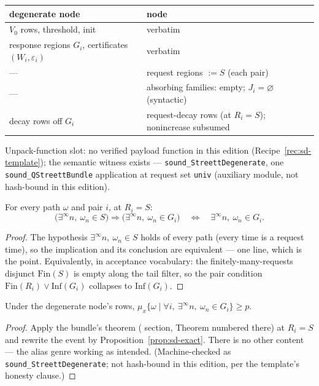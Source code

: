 \begin{brecipe}\label{rec:sd-transport}
\begin{center}\small
\begin{tabular}{@{}ll@{}}
\textbf{degenerate node} & \textbf{{QStreettBundle} node}\\
\midrule
$V_0$ rows, threshold, init & verbatim\\
response regions $G_i$, certificates $(W_i, \varepsilon_i)$ & verbatim\\
--- & request regions $:= S$ (each pair)\\
--- & absorbing families: empty; $J_i = \varnothing$ (syntactic)\\
decay rows off $G_i$ & request-decay rows (at $R_i = S$); nonincrease subsumed\\
\end{tabular}
\end{center}
Unpack-function slot: no verified payload function in this edition
(Recipe~\ref{rec:sd-template}); the semantic witness exists ---
\texttt{sound\_StreettDegenerate}, one \texttt{sound\_QStreettBundle}
application at request set \texttt{univ} (auxiliary module, not
hash-bound in this edition).
\end{brecipe}

\begin{bprop}\label{prop:sd-exact}
For every path $\omega$ and pair $i$, at $R_i = S$:
\[
\bigl(\exists^\infty n,\ \omega_n \in S\bigr) \Rightarrow
\bigl(\exists^\infty n,\ \omega_n \in G_i\bigr)
\quad\Longleftrightarrow\quad
\exists^\infty n,\ \omega_n \in G_i .
\]
\end{bprop}
\begin{proof}
The hypothesis $\exists^\infty n,\ \omega_n \in S$ holds of every path
(every time is a request time), so the implication and its conclusion are
equivalent --- one line, which is the point. Equivalently, in acceptance
vocabulary: the finitely-many-requests disjunct
$\mathrm{Fin}(S)$ is empty along the tail filter, so the pair condition
$\mathrm{Fin}(R_i) \vee \mathrm{Inf}(G_i)$ collapses to
$\mathrm{Inf}(G_i)$.
\end{proof}

\begin{bprop}\label{prop:sd-sound}
Under the degenerate node's rows,
$\mu_x\{\omega \mid \forall i,\ \exists^\infty n,\ \omega_n \in G_i\}
\ge p$.
\end{bprop}
\begin{proof}
Apply the bundle's theorem ( section,
Theorem numbered there) at $R_i = S$ and rewrite the event by
Proposition~\ref{prop:sd-exact}. There is no other content --- the alias
genre working as intended. (Machine-checked as
\texttt{sound\_StreettDegenerate}; not hash-bound in this edition, per the template's
honesty clause.)
\end{proof}

